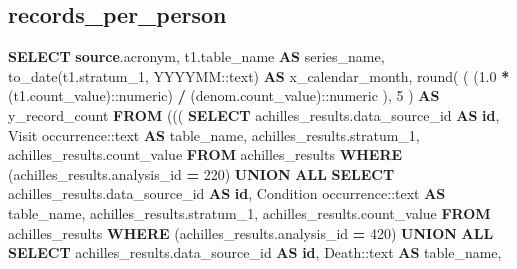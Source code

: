 \documentclass[
]{book}
\newenvironment{Shaded}{\begin{snugshade}}{\end{snugshade}}
\newcommand{\CharTok}[1]{\textcolor[rgb]{0.31,0.60,0.02}{#1}}
\newcommand{\DecValTok}[1]{\textcolor[rgb]{0.00,0.00,0.81}{#1}}
\newcommand{\FloatTok}[1]{\textcolor[rgb]{0.00,0.00,0.81}{#1}}
\newcommand{\FunctionTok}[1]{\textcolor[rgb]{0.00,0.00,0.00}{#1}}
\newcommand{\KeywordTok}[1]{\textcolor[rgb]{0.13,0.29,0.53}{\textbf{#1}}}
\newcommand{\NormalTok}[1]{#1}
\newcommand{\OperatorTok}[1]{\textcolor[rgb]{0.81,0.36,0.00}{\textbf{#1}}}
\newcommand{\StringTok}[1]{\textcolor[rgb]{0.31,0.60,0.02}{#1}}
\begin{document}
\hypertarget{records_per_person}{%
\subsection*{records\_per\_person}\label{records_per_person}}

\begin{Shaded}
\begin{Highlighting}[]
\KeywordTok{SELECT} \KeywordTok{source}\NormalTok{.acronym,}
\NormalTok{   t1.table\_name }\KeywordTok{AS}\NormalTok{ series\_name,}
   \FunctionTok{to\_date}\NormalTok{(t1.stratum\_1, }\StringTok{\textquotesingle{}YYYYMM\textquotesingle{}}\NormalTok{:}\CharTok{:text}\NormalTok{) }\KeywordTok{AS}\NormalTok{ x\_calendar\_month,}
   \FunctionTok{round}\NormalTok{(}
\NormalTok{     (}
\NormalTok{       (}\FloatTok{1.0} \OperatorTok{*}\NormalTok{ (t1.count\_value):}\CharTok{:numeric}\NormalTok{)}
       \OperatorTok{/}
\NormalTok{       (denom.count\_value):}\CharTok{:numeric}
\NormalTok{     ),}
     \DecValTok{5}
\NormalTok{   ) }\KeywordTok{AS}\NormalTok{ y\_record\_count}
  \KeywordTok{FROM}\NormalTok{ ((( }\KeywordTok{SELECT}\NormalTok{ achilles\_results.data\_source\_id }\KeywordTok{AS} \KeywordTok{id}\NormalTok{,}
           \StringTok{\textquotesingle{}Visit occurrence\textquotesingle{}}\NormalTok{:}\CharTok{:text} \KeywordTok{AS}\NormalTok{ table\_name,}
\NormalTok{           achilles\_results.stratum\_1,}
\NormalTok{           achilles\_results.count\_value}
          \KeywordTok{FROM}\NormalTok{ achilles\_results}
         \KeywordTok{WHERE}\NormalTok{ (achilles\_results.analysis\_id }\OperatorTok{=} \DecValTok{220}\NormalTok{)}
       \KeywordTok{UNION} \KeywordTok{ALL}
        \KeywordTok{SELECT}\NormalTok{ achilles\_results.data\_source\_id }\KeywordTok{AS} \KeywordTok{id}\NormalTok{,}
           \StringTok{\textquotesingle{}Condition occurrence\textquotesingle{}}\NormalTok{:}\CharTok{:text} \KeywordTok{AS}\NormalTok{ table\_name,}
\NormalTok{           achilles\_results.stratum\_1,}
\NormalTok{           achilles\_results.count\_value}
          \KeywordTok{FROM}\NormalTok{ achilles\_results}
         \KeywordTok{WHERE}\NormalTok{ (achilles\_results.analysis\_id }\OperatorTok{=} \DecValTok{420}\NormalTok{)}
       \KeywordTok{UNION} \KeywordTok{ALL}
        \KeywordTok{SELECT}\NormalTok{ achilles\_results.data\_source\_id }\KeywordTok{AS} \KeywordTok{id}\NormalTok{,}
           \StringTok{\textquotesingle{}Death\textquotesingle{}}\NormalTok{:}\CharTok{:text} \KeywordTok{AS}\NormalTok{ table\_name,}

\end{Highlighting}
\end{Shaded}
\end{document}
